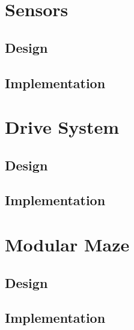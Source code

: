 \section{Sensors}\label{mech/sensors}


\subsection{Design}\label{mech/sensors/design}

\subsection{Implementation}\label{mech/sensors/impl}



\section{Drive System}\label{mech/drive}

\subsection{Design}\label{mech/drive/design}

\subsection{Implementation}\label{mech/drive/impl}



\section{Modular Maze}\label{mech/maze}

\subsection{Design}\label{mech/maze/design}

\subsection{Implementation}\label{mech/maze/impl}